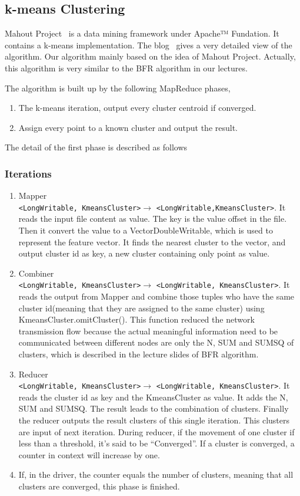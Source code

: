 \documentclass[a4paper,11pt]{article}
\begin{document}
\subsection{k-means Clustering}
Mahout Project~\cite{apache:mahout} is a data mining framework under Apache™
Fundation. It contains a k-means implementation. The blog~\cite{algo:kmeans3}
gives a very detailed view of the algorithm. Our algorithm mainly based on the
idea of Mahout Project. Actually, this algorithm is very similar to the BFR
algorithm in our lectures.

The algorithm is built up by the following MapReduce phases,
\begin{enumerate}
  \item The k-means iteration, output every cluster centroid if
  converged.  	
  \item Assign every point to a known cluster and output the result.
\end{enumerate}

The detail of the first phase is described as follows
\subsubsection{Iterations}
\begin{enumerate}
  \item Mapper\\\verb|<LongWritable, KmeansCluster>|$\rightarrow$
  \verb|<LongWritable,KmeansCluster>|. It reads the input file content as value.
  The key is the value offset in the file. Then it convert the value to a
  VectorDoubleWritable, which is used to represent the feature vector. It finds
  the nearest cluster to the vector, and output cluster id as key, a new cluster
  containing only point as value.
  \item Combiner\\\verb|<LongWritable, KmeansCluster>|$\rightarrow$
  \verb|<LongWritable, KmeansCluster>|. It reads the output from Mapper and
  combine those tuples who have the same cluster id(meaning that they are
  assigned to the same cluster) using KmeansCluster.omitCluster(). This function
  reduced the network transmission flow because the actual meaningful
  information need to be communicated between different nodes are only the N,
  SUM and SUMSQ of clusters, which is described in the lecture slides of BFR 
  algorithm. 
  \item Reducer\\\verb|<LongWritable, KmeansCluster>|$\rightarrow$
  \verb|<LongWritable, KmeansCluster>|. It reads the cluster id as key and the
  KmeansCluster as value. It adds the N, SUM and SUMSQ. The result leads to the
  combination of clusters. Finally the reducer outputs the result clusters of
  this single iteration. This clusters are input of next iteration. During
  reducer, if the movement of one cluster if less than a threshold, it's said
  to be ``Converged''. If a cluster is converged, a counter in context will
  increase by one.
  \item If, in the driver, the counter equals the number of clusters, meaning
  that all clusters are converged, this phase is finished.
\end{enumerate} 
\end{document}
